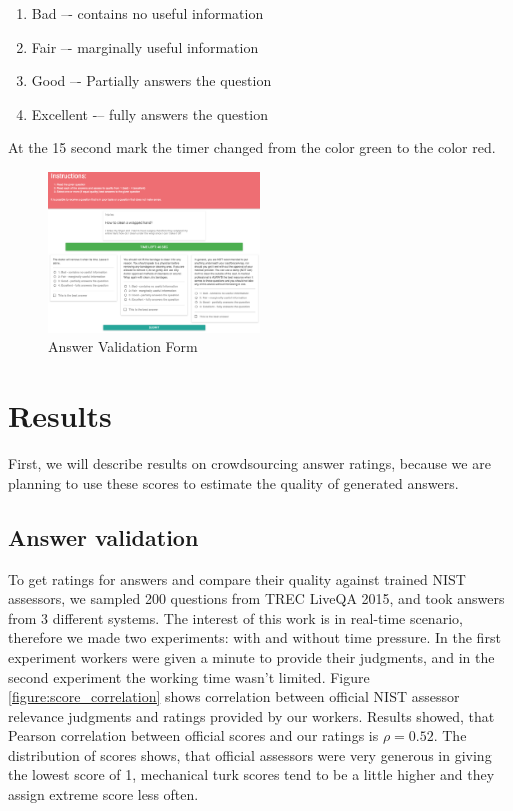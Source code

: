 \documentclass[11pt,letterpaper]{article}
\begin{document}
\begin{enumerate}
\item Bad –- contains no useful information
\item Fair –- marginally useful information
\item Good –- Partially answers the question
\item Excellent -– fully answers the question
\end{enumerate}

At the 15 second mark the timer changed from the color green to the color red.

\begin{figure}[h]
\centering
\includegraphics[width=0.5\textwidth]{img/validation_screenshot}
\caption{Answer Validation Form}
\label{fig:validation_form}
\end{figure}

\section{Results}
\label{sec:results}

First, we will describe results on crowdsourcing answer ratings, because we are planning to use these scores to estimate the quality of generated answers.

\subsection{Answer validation}

To get ratings for answers and compare their quality against trained NIST assessors, we sampled 200 questions from TREC LiveQA 2015, and took answers from 3 different systems.
The interest of this work is in real-time scenario, therefore we made two experiments: with and without time pressure.
In the first experiment workers were given a minute to provide their judgments, and in the second experiment the working time wasn't limited.
Figure \ref{figure:score_correlation} shows correlation between official NIST assessor relevance judgments and ratings provided by our workers.
Results showed, that Pearson correlation between official scores and our ratings is $\rho=0.52$.
The distribution of scores shows, that official assessors were very generous in giving the lowest score of 1, mechanical turk scores tend to be a little higher and they assign extreme score less often.
\end{document}
